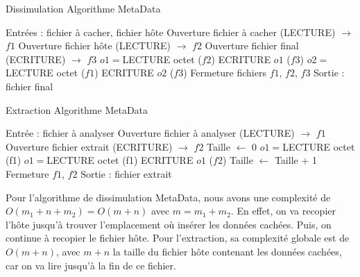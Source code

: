 \documentclass[11pt]{article}
\begin{document}
\begin{minipage}{.5\textwidth}
\begin{algorithm}[H]
\caption{Dissimulation Algorithme MetaData}
\begin{algorithmic}
\color{green}
\STATE \footnotesize Entrées : fichier à cacher, fichier hôte
\color{black}
\STATE Ouverture fichier à cacher (LECTURE) $\rightarrow$ $f1$
\STATE Ouverture fichier hôte (LECTURE) $\rightarrow$ $f2$
\STATE Ouverture fichier final (ECRITURE) $\rightarrow$ $f3$
\STATE $o1 = $LECTURE octet ($f2$)
\STATE ECRITURE $o1$ ($f3$)
\STATE $o2 = $LECTURE octet ($f1$)
\STATE ECRITURE $o2$  ($f3$)
\ENDWHILE
\ENDIF
\ENDWHILE
\STATE Fermeture fichiers $f1$, $f2$, $f3$
\color{green}
\STATE Sortie : fichier final
\color{black}
\end{algorithmic}
\end{algorithm}
\normalsize
\end{minipage}
\begin{minipage}{.5\textwidth}
\begin{algorithm}[H]
\caption{Extraction Algorithme MetaData}
\begin{algorithmic}
\color{green}
\STATE \footnotesize Entrée : fichier à analyser
\color{black}
\STATE Ouverture fichier à analyser (LECTURE) $\rightarrow$ $f1$
\STATE Ouverture fichier extrait (ECRITURE) $\rightarrow$ $f2$
\STATE Taille $\leftarrow$ 0
\STATE $o1 = $LECTURE octet (f1)
\STATE $o1 = $LECTURE octet (f1)
\STATE ECRITURE $o1$ ($f2$)
\STATE Taille $\leftarrow$ Taille + 1
\ENDWHILE
\ENDIF
\ENDWHILE
\STATE Fermeture $f1$, $f2$
\color{green}
\STATE Sortie : fichier extrait
\color{black}
\end{algorithmic}
\end{algorithm}
\normalsize
\end{minipage}

Pour l'algorithme de dissimulation MetaData, nous avons une complexité de 
$O(m_1+n+m_2)=O(m+n)$ avec $m=m_1+m_2$. En effet, on va recopier l'hôte 
jusqu'à trouver l'emplacement où insérer les données cachées. Puis, on 
continue à recopier le fichier hôte. \newline
Pour l'extraction, sa complexité globale est de $O(m+n)$, avec $m+n$ la taille 
du fichier hôte contenant les données cachées, car on va lire jusqu'à 
la fin de ce fichier. 
\end{document}
